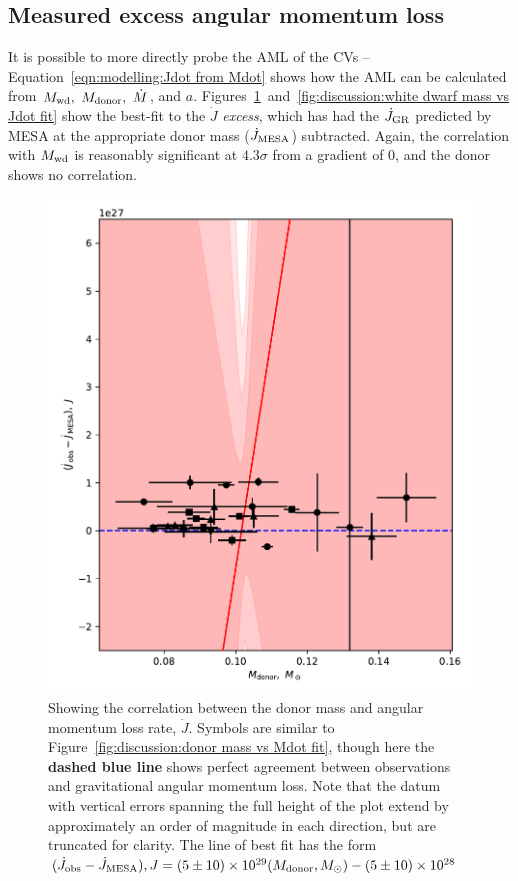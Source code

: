 \subsection{Measured excess angular momentum loss}

It is possible to more directly probe the AML of the CVs -- Equation~\ref{eqn:modelling:Jdot from Mdot} shows how the AML can be calculated from $M_{\rm wd},\ M_{\rm donor},\ \dot M$, and $a$.
Figures~\ref{fig:discussion:donor mass vs Jdot fit}~and~\ref{fig:discussion:white dwarf mass vs Jdot fit} show the best-fit to the $\dot J$ \textit{excess}, which has had the $\dot J_{\rm GR}$ predicted by MESA at the appropriate donor mass ($\dot J_{\rm MESA}$) subtracted.
Again, the correlation with $M_{\rm wd}$ is reasonably significant at $4.3\sigma$ from a gradient of 0, and the donor shows no correlation.
\begin{figure}
    \centering
    \includegraphics[width=\textwidth]{figures/results/Mdot/Mr_Jdot_ex.pdf}
    \caption{Showing the correlation between the donor mass and angular momentum loss rate, $\dot J$. Symbols are similar to Figure~\ref{fig:discussion:donor mass vs Mdot fit}, though here the {\bf dashed blue line} shows perfect agreement between observations and gravitational angular momentum loss. Note that the datum with vertical errors spanning the full height of the plot extend by approximately an order of magnitude in each direction, but are truncated for clarity. The line of best fit has the form $(\dot J_{\rm obs} - \dot J_{\rm MESA}), J = (5\pm10) \times 10^{29}(M_{\rm donor}, M_\odot) - (5\pm10)\times10^{28}$}
    \label{fig:discussion:donor mass vs Jdot fit}
\end{figure}
